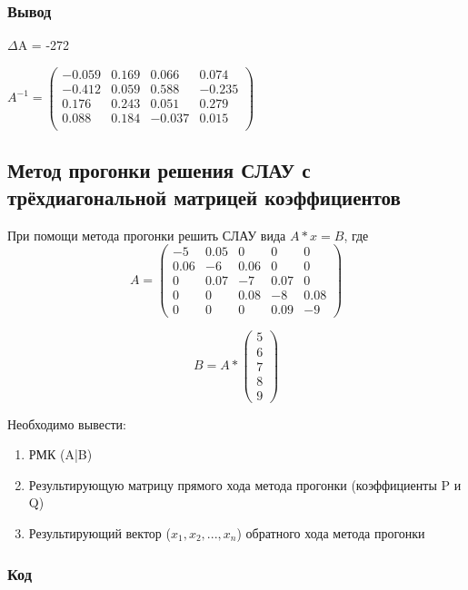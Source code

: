 \documentclass[bachelor, och, pract]{SCWorks}
\begin{document}
\subsubsection{Вывод}

$\Delta$A = -272


$A^{-1} = \begin{pmatrix}
-0.059  &    0.169  &    0.066  &    0.074\\
    -0.412   &   0.059    &  0.588 &    -0.235\\
     0.176    &  0.243    &  0.051  &    0.279\\
     0.088    &  0.184   &  -0.037   &   0.015\\
\end{pmatrix}$


\subsection{Метод прогонки решения СЛАУ с трёхдиагональной матрицей
коэффициентов}

При помощи метода прогонки решить СЛАУ вида $A*x = B$, где
 $$A = \begin{pmatrix}
-5 & 0.05 & 0 & 0 & 0 \\
0.06 & -6 & 0.06 & 0 & 0 \\
0 & 0.07 & -7 & 0.07 & 0 \\
0 & 0 & 0.08 & -8 & 0.08 \\
0 & 0 & 0 & 0.09 & -9 
\end{pmatrix}$$

$$ B = A *
\begin{pmatrix}
5 \\
6 \\
7 \\
8 \\
9
\end{pmatrix}
$$

Необходимо вывести: 
\begin{enumerate}
    \item РМК (A|B)
    \item Результирующую матрицу прямого хода метода прогонки (коэффициенты P и Q)
    \item Результирующий вектор ($x_1, x_2, ..., x_n$) обратного хода метода прогонки
\end{enumerate}

\subsubsection{Код}
\end{document}
